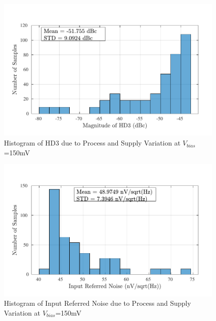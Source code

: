 \begin{figure} [H]
\centering
\includegraphics[scale=1]{Figures/Corners/Overall/PV_Min/PDFs/PV_Min_hd3.pdf}
\caption{Histogram of HD3 due to Process and Supply Variation at $V_{bias}$=150mV}
\end{figure}

\begin{figure} [H]
\centering
\includegraphics[scale=1]{Figures/Corners/Overall/PV_Min/PDFs/PV_Min_irn.pdf}
\caption{Histogram of Input Referred Noise due to Process and Supply Variation at $V_{bias}$=150mV}
\end{figure}

